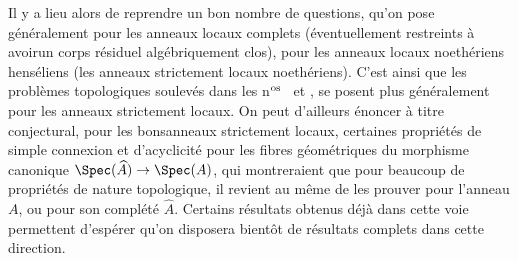Il y a lieu alors de reprendre un bon nombre de questions, qu'on pose g\'en\'eralement pour les anneaux locaux complets (\'eventuellement restreints \`a avoir\pageoriginale un corps r\'esiduel alg\'ebriquement clos), pour les anneaux locaux noeth\'eriens hens\'eliens (\resp les anneaux strictement locaux noeth\'eriens). C'est ainsi que les probl\`emes topologiques soulev\'es dans les n$^{\textup{os}}$~ et , se posent plus g\'en\'eralement pour les anneaux strictement locaux. On peut d'ailleurs \'enoncer \`a titre conjectural, pour les \og bons\fg anneaux strictement locaux, certaines propri\'et\'es de simple connexion et d'acyclicit\'e pour les fibres g\'eom\'etriques du morphisme canonique $\Spec(\widehat{A})\to\Spec(A)$, qui montreraient que pour beaucoup de propri\'et\'es de nature \og topologique\fg, il revient au m\^eme de les prouver pour l'anneau $A$, ou pour son compl\'et\'e $\widehat{A}$. Certains r\'esultats obtenus d\'ej\`a dans cette voie permettent d'esp\'erer qu'on disposera bient\^{o}t de r\'esultats complets dans cette direction.

